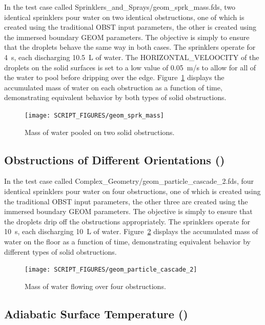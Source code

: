 \documentclass[11pt]{book}
\begin{document}
In the test case called {\ct Sprinklers\_and\_Sprays/geom\_sprk\_mass.fds}, two identical sprinklers pour water on two identical obstructions, one of which is created using the traditional {\ct OBST} input parameters, the other is created using the immersed boundary {\ct GEOM} parameters. The objective is simply to ensure that the droplets behave the same way in both cases. The sprinklers operate for 4~s, each discharging 10.5~L of water. The {\ct HORIZONTAL\_VELOOCITY} of the droplets on the solid surfaces is set to a low value of 0.05~m/s to allow for all of the water to pool before dripping over the edge. Figure~\ref{geom_sprk_mass_fig} displays the accumulated mass of water on each obstruction as a function of time, demonstrating equivalent behavior by both types of solid obstructions.
\begin{figure}[h!]
\centering
\texttt{[image: SCRIPT\_FIGURES/geom\_sprk\_mass]}
\caption[The {\ct geom\_sprk\_mass} test case]{Mass of water pooled on two solid obstructions.}
\label{geom_sprk_mass_fig}
\end{figure}

\subsection{Obstructions of Different Orientations (\texorpdfstring{{}}{geom\_particle\_cascade\_2}) }
\label{geom_particle_cascade_2}

In the test case called {\ct Complex\_Geometry/geom\_particle\_cascade\_2.fds}, four identical sprinklers pour water on four obstructions, one of which is created using the traditional {\ct OBST} input parameters, the other three are created using the immersed boundary {\ct GEOM} parameters. The objective is simply to ensure that the droplets drip off the obstructions appropriately. The sprinklers operate for 10~s, each discharging 10~L of water. Figure~\ref{geom_particle_cascade_2_fig} displays the accumulated mass of water on the floor as a function of time, demonstrating equivalent behavior by different types of solid obstructions.
\begin{figure}[h!]
\centering
\texttt{[image: SCRIPT\_FIGURES/geom\_particle\_cascade\_2]}
\caption[The {\ct geom\_particle\_cascade\_2} test case]{Mass of water flowing over four obstructions.}
\label{geom_particle_cascade_2_fig}
\end{figure}


\subsection{Adiabatic Surface Temperature (\texorpdfstring{{}}{adiabatic\_surf\_temp\_spray}) }
\label{AST_spray}
\end{document}
